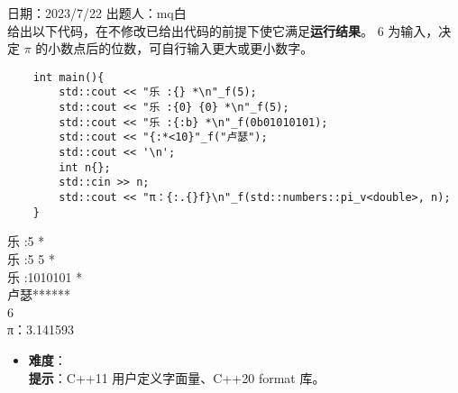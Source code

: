 日期：2023/7/22 出题人：mq白\\

给出以下代码，在不修改已给出代码的前提下使它满足\textbf{运行结果}。
6 为输入，决定 \textbf{$\pi$} 的小数点后的位数，可自行输入更大或更小数字。


\begin{verbatim}
    int main(){
        std::cout << "乐 :{} *\n"_f(5);
        std::cout << "乐 :{0} {0} *\n"_f(5);
        std::cout << "乐 :{:b} *\n"_f(0b01010101);
        std::cout << "{:*<10}"_f("卢瑟");
        std::cout << '\n';
        int n{};
        std::cin >> n;
        std::cout << "π：{:.{}f}\n"_f(std::numbers::pi_v<double>, n);
    }
\end{verbatim}

\begin{tcolorbox}[title = {要求运行结果},
        fonttitle = \bfseries, fontupper = \sffamily, fontlower = \itshape]
    乐 :5 *\\
    乐 :5 5 *\\
    乐 :1010101 *\\
    卢瑟******\\
    6\\
    π：3.141593
\end{tcolorbox}


\begin{itemize}
    \item \textbf{难度}：  \\ 
    \textbf{提示}：C++11 用户定义字面量、C++20 format 库。
\end{itemize}